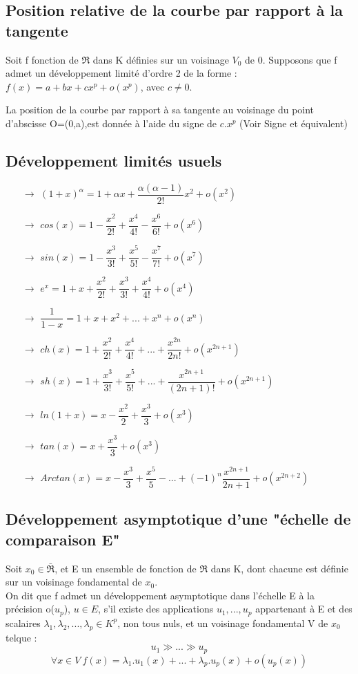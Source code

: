 \subsection{Position relative de la courbe par rapport à la tangente}
Soit f fonction de $\Re$ dans K définies sur un voisinage $V_0$ de 0.
Supposons que f admet un développement limité d'ordre 2 de la forme : $f(x) = a + bx + cx^p + o(x^p)$, avec $c\neq 0$.
\begin{prop}
La position de la courbe par rapport à sa tangente au voisinage du point d'abscisse O=(0,a),est donnée à l'aide du signe de $c.x^p$ (Voir Signe et équivalent)
\end{prop}
\subsection{Développement limités usuels}
\begin{itemize}
 \item[$\rightarrow$]$(1+x)^{\alpha} = 1 + \alpha x+\dfrac{\alpha (\alpha - 1)}{2!}x^2+o(x^2)$
 \item[$\rightarrow$]$cos(x) = 1 - \dfrac{x^2}{2!}+\dfrac{x^4}{4!}-\dfrac{x^6}{6!}+o(x^6)$
 \item[$\rightarrow$]$sin(x) = 1 - \dfrac{x^3}{3!}+\dfrac{x^5}{5!}-\dfrac{x^7}{7!}+o(x^7)$
 \item[$\rightarrow$]$e^x = 1 +x + \dfrac{x^2}{2!}+\dfrac{x^3}{3!}+\dfrac{x^4}{4!}+o(x^4)$
 \item[$\rightarrow$]$\dfrac{1}{1-x} = 1+x+x^2+...+x^n+o(x^n)$
 \item[$\rightarrow$]$ch(x) = 1 + \dfrac{x^2}{2!}+\dfrac{x^4}{4!}+...+\dfrac{x^{2n}}{2n!}+o(x^{2n+1})$
 \item[$\rightarrow$]$sh(x) = 1 + \dfrac{x^3}{3!}+\dfrac{x^5}{5!}+...+\dfrac{x^{2n+1}}{(2n+1)!}+o(x^{2n+1})$
 \item[$\rightarrow$]$ln(1+x) = x - \dfrac{x^2}{2} + \dfrac{x^3}{3} +o(x^3)$
 \item[$\rightarrow$]$tan(x) = x + \dfrac{x^3}{3}+o(x^3)$
 \item[$\rightarrow$]$Arctan(x) = x- \dfrac{x^3}{3}+\dfrac{x^5}{5}-...+(-1)^n\dfrac{x^{2n+1}}{2n+1}+o(x^{2n+2})$
\end{itemize}
\subsection{Développement asymptotique d'une "échelle de comparaison E"}
\begin{de}
Soit $x_0 \in \bar{\Re}$, et E un ensemble de fonction de $\Re$ dans K, dont chacune est définie sur un voisinage fondamental de $x_0$.\\
On dit que f admet un développement asymptotique dans l'échelle E à la précision o($u_p$), $u \in E$, s'il existe des applications $u_1,...,u_p$ appartenant à E et des scalaires $\lambda_1,\lambda_2,...,\lambda_p \in K^p$, non tous nuls, et un voisinage fondamental V de $x_0$ telque :
$$u_1 \gg ... \gg u_p$$
$$\forall x \in V~ f(x)=\lambda_1.u_1(x)+...+\lambda_p.u_p(x)+o(u_p(x))$$
\end{de}
